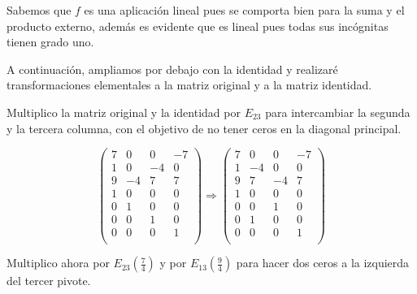 \documentclass[11pt, a4paper]{article}
\newif\IfInSansMode
\theoremstyle{theorem-style}
\theoremstyle{definition-style}
\theoremstyle{remark-style}
\theoremstyle{example-style}
\begin{document}
Sabemos que $f$ es una aplicación lineal pues se comporta bien para la suma y el producto externo, además es evidente que es lineal pues todas sus incógnitas tienen grado uno.

A continuación, ampliamos por debajo con la identidad y realizaré transformaciones elementales a la matriz original y a la matriz identidad.

Multiplico la matriz original y la identidad por $E_23$ para intercambiar la segunda y la tercera columna, con el objetivo de no tener ceros en la diagonal principal.

$$\begin{pmatrix}
7 & 0 & 0 & -7\\
1 & 0 & -4 & 0\\
9 & -4 & 7 & 7\\
1 & 0 & 0 & 0\\
0 & 1 & 0 & 0\\
0 & 0 & 1 & 0\\
0 & 0 & 0 & 1\\
\end{pmatrix} \Longrightarrow
\begin{pmatrix}
7 & 0 & 0 & -7\\
1 & -4 & 0 & 0\\
9 & 7 & -4 & 7\\
1 & 0 & 0 & 0\\
0 & 0 & 1 & 0\\
0 & 1 & 0 & 0\\
0 & 0 & 0 & 1\\
\end{pmatrix}$$

Multiplico ahora por $E_{23}(\frac{7}{4})$ y por $E_{13}(\frac{9}{4})$ para hacer dos ceros a la izquierda del tercer pivote. \\
\end{document}
